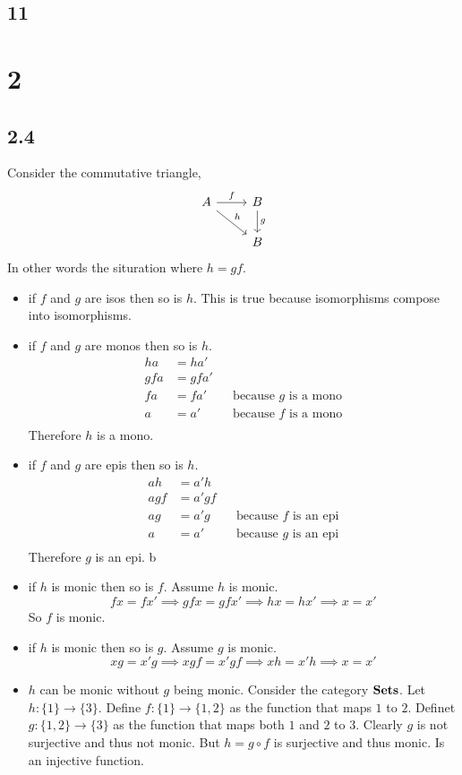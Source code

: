 \documentclass{book}
\theoremstyle{definition}
\newcommand{\arr}[3]{#1 : #2 \rightarrow #3}
\begin{document}
\subsection{11}

\section{2}

\subsection{2.4}

Consider the commutative triangle,
\[
  \begin{tikzcd}
    A \arrow[r, "f"] \arrow[dr, "h"] & B \arrow[d, "g"] \\
                                     & B
  \end{tikzcd}
\]
In other words the situration where $h = gf$.
\begin{itemize}
  \item if $f$ and $g$ are isos then so is $h$. This is true because
    isomorphisms compose into isomorphisms.
  \item if $f$ and $g$ are monos then so is $h$.
    \begin{align*}
      h a &= h a' \\
      g f a &= g f a' \\
      f a &= f a' && \text{because $g$ is a mono} \\
      a &= a' && \text{because $f$ is a mono} \\
    \end{align*}
    Therefore $h$ is a mono.
  \item if $f$ and $g$ are epis then so is $h$.
    \begin{align*}
      a h &= a' h \\
      a g f &= a' g f \\
      a g &= a' g && \text{because $f$ is an epi} \\
      a &= a' && \text{because $g$ is an epi} \\
    \end{align*}
    Therefore $g$ is an epi.
b  \item if $h$ is monic then so is $f$. Assume $h$ is monic.
    \[
      f x = f x' \implies g f x = g f x' \implies h x = h x' \implies x = x'
    \]
    So $f$ is monic.
  \item if $h$ is monic then so is $g$. Assume $g$ is monic. \[ x g = x' g
    \implies x g f = x' g f \implies x h = x' h \implies x = x' \]
  \item $h$ can be monic without $g$ being monic. Consider the category
    $\bf{Sets}$. Let $\arr{h}{\{1\}}{\{3\}}$. Define $\arr{f}{\{1\}}{\{1,2\}}$
    as the function that maps $1$ to $2$. Definet $\arr{g}{\{1,2\}}{\{3\}}$ as
    the function that maps both $1$ and $2$ to $3$. Clearly $g$ is not
    surjective and thus not monic. But $h = g \circ f$ is surjective and thus
    monic. Is an injective function.
\end{itemize}
\end{document}
